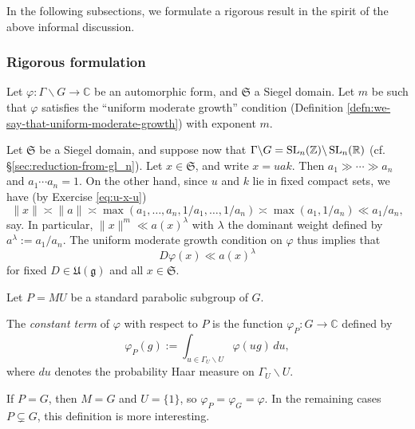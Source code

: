 \documentclass[reqno]{amsart} 
\begin{document}
In the following subsections, we formulate a rigorous result in the spirit of the above informal discussion.

\subsubsection{Rigorous formulation}
Let $\varphi : \Gamma \backslash G \rightarrow \mathbb{C}$ be an automorphic form, and $\mathfrak{S}$ a Siegel domain.  Let $m$ be such that $\varphi$ satisfies the ``uniform moderate growth'' condition (Definition \ref{defn:we-say-that-uniform-moderate-growth}) with exponent $m$.

Let $\mathfrak{S}$ be a Siegel domain, and suppose now that $\Gamma \backslash G = \operatorname{SL}_n(\mathbb{Z}) \backslash \operatorname{SL}_n(\mathbb{R})$
(cf. \S\ref{sec:reduction-from-gl_n}).  Let $x \in \mathfrak{S}$, and write $x = u a k$.  Then $a_1 \gg \dotsb \gg a_n$ and $a_1 \dotsb a_n = 1$.  On the other hand, since $u$ and $k$ lie in fixed compact sets, we have (by Exercise \ref{eq:u-x-u})
\begin{equation*}
  \|x\| \asymp \|a\| \asymp \max(a_1,\dotsc,a_n,1/a_1,\dotsc,1/a_n) \asymp \max(a_1,1/a_n) \ll a_1/a_n,
\end{equation*}
say.  In particular, $\|x\|^m \ll a(x)^{\lambda}$ with $\lambda$ the dominant weight defined by $a^{\lambda} := a_1/a_n$.  The uniform moderate growth condition on $\varphi$ thus implies that
\begin{equation}\label{eq:d-varphix-ll}
  D \varphi(x) \ll a(x)^{\lambda}
\end{equation}
for fixed $D \in \mathfrak{U}(\mathfrak{g})$ and all $x \in \mathfrak{S}$.

Let $P = M U$ be a standard parabolic subgroup of $G$.

\begin{definition}\label{defn:stoes2021:emphc-term-varphi}
  The \emph{constant term} of $\varphi$ with respect to $P$ is the function $\varphi_P : G \rightarrow \mathbb{C}$
  defined by
  \begin{equation*}
    \varphi_P(g) := \int _{u \in \Gamma_U \backslash U} \varphi(u g) \, d u,
  \end{equation*}
  where $d u$ denotes the probability Haar measure on $\Gamma_U \backslash U$.
\end{definition}
\begin{example}
  If $P = G$, then $M = G$ and $U = \{1\}$, so $\varphi_P = \varphi_G = \varphi$.  In the remaining cases $P \subsetneq G$, this definition is more interesting.
\end{example}
\end{document}
